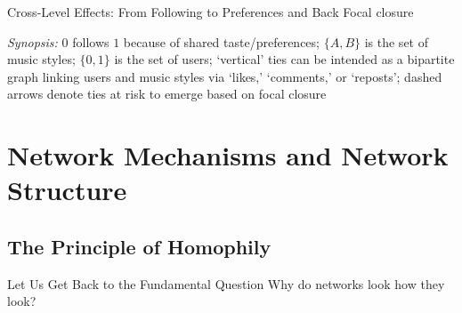 \documentclass[notes, aspectratio=1610]{beamer}
\begin{document}
\begin{frame}{Cross-Level Effects: From Following to Preferences and Back}
	{Focal closure}
	\centering
	

	\raggedright
	\small
	\textit{Synopsis:} $0$ follows $1$ because of shared taste/preferences; 
	$\{A, B\}$ is the set of music styles; $\{0, 1\}$ is
	the set of users; `vertical' ties can be intended as a bipartite 
	graph linking users and music styles via `likes,' `comments,' or
	`reposts'; dashed arrows denote ties at risk to emerge based on 
	focal closure 
\end{frame}



\section{Network Mechanisms and Network Structure}

\subsection{The Principle of Homophily}

\begin{frame}{Let Us Get Back to the Fundamental Question}{}
\centering
\Large 
Why do networks look how they look?
\end{frame}
\end{document}
